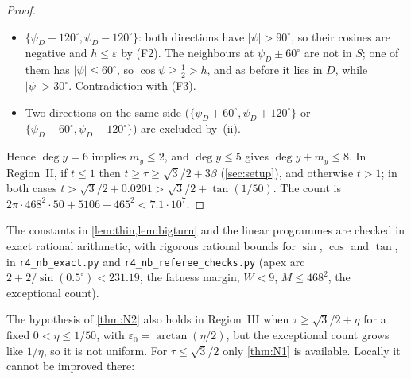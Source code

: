 \documentclass[11pt]{amsart}
\theoremstyle{definition}
\theoremstyle{remark}
\newcommand{\eps}{\varepsilon}
\begin{document}
\begin{proof}
\begin{itemize}[leftmargin=2em]
\item $\{\psi_D+120^\circ,\psi_D-120^\circ\}$: both directions have $|\psi|>90^\circ$, so their cosines are negative and $h\le\eps$ by (F2). The neighbours at $\psi_D\pm60^\circ$ are not in $S$; one of them has $|\psi|\le60^\circ$, so $\cos\psi\ge\frac12>h$, and as before it lies in $D$, while $|\psi|>30^\circ$. Contradiction with (F3).
\item Two directions on the same side ($\{\psi_D+60^\circ,\psi_D+120^\circ\}$ or $\{\psi_D-60^\circ,\psi_D-120^\circ\}$) are excluded by~(ii).
\end{itemize}
Hence $\deg y=6$ implies $m_y\le2$, and $\deg y\le5$ gives $\deg y+m_y\le8$.
In Region~II, if $t\le1$ then $t\ge\tau\ge\sqrt3/2+3\beta$ (\cref{sec:setup}), and otherwise $t>1$; in both cases $t>\sqrt3/2+0.0201>\sqrt3/2+\tan(1/50)$. The count is $2\pi\cdot468^2\cdot50+5106+465^2<7.1\cdot10^7$.
\end{proof}

The constants in \cref{lem:thin,lem:bigturn} and the linear programmes are checked in exact rational arithmetic, with rigorous rational bounds for $\sin$, $\cos$ and $\tan$, in \texttt{r4\_nb\_exact.py} and \texttt{r4\_nb\_referee\_checks.py} (apex arc $2+2/\sin(0.5^\circ)<231.19$, the fatness margin, $W<9$, $M\le468^2$, the exceptional count).

The hypothesis of \cref{thm:N2} also holds in Region~III when $\tau\ge\sqrt3/2+\eta$ for a fixed $0<\eta\le1/50$, with $\eps_0=\arctan(\eta/2)$, but the exceptional count grows like $1/\eta$, so it is not uniform. For $\tau\le\sqrt3/2$ only \cref{thm:N1} is available. Locally it cannot be improved there:
\end{document}
